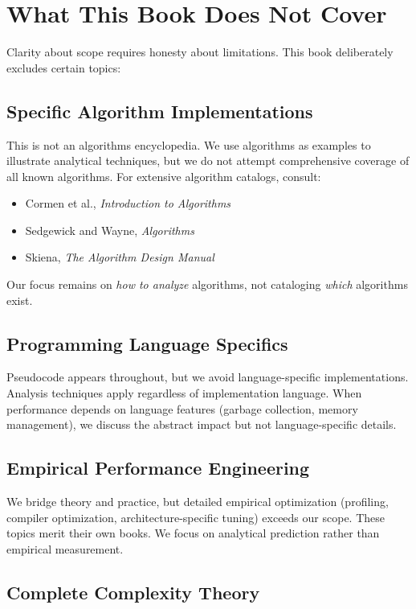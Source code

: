 \section{What This Book Does Not Cover}

Clarity about scope requires honesty about limitations. This book deliberately excludes certain topics:

\subsection{Specific Algorithm Implementations}

This is not an algorithms encyclopedia. We use algorithms as examples to illustrate analytical techniques, but we do not attempt comprehensive coverage of all known algorithms. For extensive algorithm catalogs, consult:
\begin{itemize}
    \item Cormen et al., \textit{Introduction to Algorithms}
    \item Sedgewick and Wayne, \textit{Algorithms}
    \item Skiena, \textit{The Algorithm Design Manual}
\end{itemize}
Our focus remains on \textit{how to analyze} algorithms, not cataloging \textit{which} algorithms exist.

\subsection{Programming Language Specifics}

Pseudocode appears throughout, but we avoid language-specific implementations. Analysis techniques apply regardless of implementation language. When performance depends on language features (garbage collection, memory management), we discuss the abstract impact but not language-specific details.

\subsection{Empirical Performance Engineering}

We bridge theory and practice, but detailed empirical optimization (profiling, compiler optimization, architecture-specific tuning) exceeds our scope. These topics merit their own books. We focus on analytical prediction rather than empirical measurement.

\subsection{Complete Complexity Theory}

